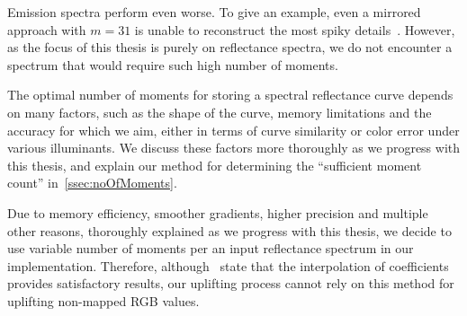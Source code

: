 Emission spectra perform even worse. To give an example, even a mirrored approach with $m=31$ is unable to reconstruct the most spiky details~\cite{trigonometricMomentsPaper}. However, as the focus of this thesis is purely on reflectance spectra, we do not encounter a spectrum that would require such high number of moments.

The optimal number of moments for storing a spectral reflectance curve depends on many factors, such as the shape of the curve, memory limitations and the accuracy for which we aim, either in terms of curve similarity or color error under various illuminants. We discuss these factors more thoroughly as we progress with this thesis, and explain our method for determining the ``sufficient moment count'' in~\cref{ssec:noOfMoments}.

Due to memory efficiency, smoother gradients, higher precision and multiple other reasons, thoroughly  explained as we progress with this thesis, we decide to use variable number of moments per an input reflectance spectrum in our implementation. Therefore, although~\citet{trigonometricMomentsPaper} state that the interpolation of coefficients provides satisfactory results, our uplifting process cannot rely on this method for uplifting non-mapped RGB values. 
